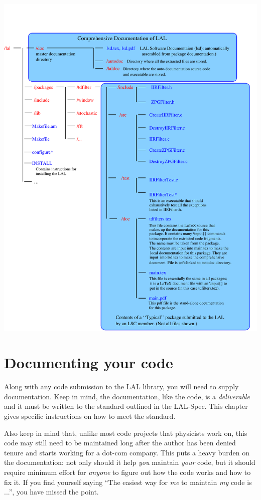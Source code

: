 \documentclass[oneside]{book}
\begin{document}
\noindent\includegraphics[width=0.9\linewidth,angle=0]{lsdFigDirStructure}

\chapter{Documenting your code}
\label{c:DocumentingCode}

Along with any code submission to the LAL library, you will need to
supply documentation. Keep in mind, the documentation, like the code,
is a {\it deliverable} and it must be written to the standard outlined
in the LAL-Spec.  This chapter gives specific instructions  on how 
to meet the standard.

Also keep in mind that, unlike most code projects that physicists work
on, this code may still need to be maintained long after the author
has been denied tenure and starts working for a dot-com company.  This
puts a heavy burden on the documentation: not only should it help {\it
you} maintain {\it your} code, but it should require minimum effort
for {\it anyone} to figure out how the code works and how to fix it.
If you find yourself saying ``The easiest way for {\it me} to maintain
{\it my} code is ...'', you have missed the point.
\end{document}
